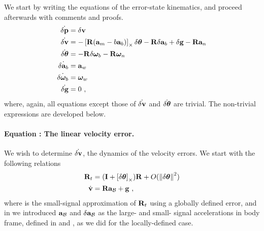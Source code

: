 We start by writing the equations of the error-state kinematics, and proceed afterwards with comments and proofs.
%
\begin{subequations}\label{equ:efullglobal}
%
\begin{align}
\dot{\delta{\bf p}} &= \delta{\bf v} \label{equ:epglobal} \\
\dot{\delta{\bf v}} &= -\left[{\bf R}({\bf a}_m-b{\bf a}_b)\right]_\times\delta{\bm \theta} - {\bf R}\delta{\bf a}_b + \delta{\bf g} - {\bf R}{\bf a}_n \label{equ:evglobal}\\
\dot{\delta{\bm \theta}} &= -{\bf R}\delta{\bm \omega}_b - {\bf R}{\bm \omega}_n \label{equ:etglobal}\\
\dot{\delta{\bf a}_b} &= {\bf a}_w \label{equ:eabglobal}\\
\dot{\delta{\bm \omega}_b} &= {\bm \omega}_w \label{equ:ewbglobal}\\
\dot{\delta{\bf g}} &= 0 ~, \label{equ:egglobal}
\end{align}%
\end{subequations}%
%
where, again, all equations except those of $\dot{\delta{\bf v}}$ and $\dot{\delta{\bm \theta}}$ are trivial. 
The non-trivial expressions are developed below.


\paragraph{Equation : The linear velocity error.}

We wish to determine $\dot{\delta{\bf v}}$, the dynamics of the velocity errors. 
We start with the following relations
%
%
\begin{align}
{\bf R}_t &= ({\bf I}+\left[\delta{\bm \theta}\right]_\times){\bf R}  + O({\left\|\delta{\bm \theta}\right\|}^2) \label{equ:Rtglobal}\\
\dot{{\bf v}} &= {\bf R}{\bf a}_{\mathcal{B}} + {\bf g}~, \label{equ:vdot2global}
\end{align}%
%
where  is the small-signal approximation of ${\bf R}_t$ using a globally defined error, and in  we introduced ${\bf a}_{\mathcal{B}}$ and $\delta{\bf a}_{\mathcal{B}}$ as the large- and small- signal accelerations in body frame, defined in and , as we did for the locally-defined case.

